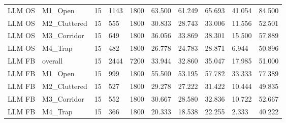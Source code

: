 \begin{tabular}{llllllllll}
LLM OS & M1\_Open & 15 & 1143 & 1800 & 63.500 & 61.249 & 65.693 & 41.054 & 84.500 \\
LLM OS & M2\_Cluttered & 15 & 555 & 1800 & 30.833 & 28.743 & 33.006 & 11.556 & 52.501 \\
LLM OS & M3\_Corridor & 15 & 649 & 1800 & 36.056 & 33.869 & 38.301 & 15.500 & 57.889 \\
LLM OS & M4\_Trap & 15 & 482 & 1800 & 26.778 & 24.783 & 28.871 & 6.944 & 50.896 \\
LLM FB & overall & 15 & 2444 & 7200 & 33.944 & 32.860 & 35.047 & 17.985 & 51.000 \\
LLM FB & M1\_Open & 15 & 999 & 1800 & 55.500 & 53.195 & 57.782 & 33.333 & 77.389 \\
LLM FB & M2\_Cluttered & 15 & 527 & 1800 & 29.278 & 27.222 & 31.422 & 10.444 & 49.835 \\
LLM FB & M3\_Corridor & 15 & 552 & 1800 & 30.667 & 28.580 & 32.836 & 10.722 & 52.667 \\
LLM FB & M4\_Trap & 15 & 366 & 1800 & 20.333 & 18.538 & 22.255 & 2.333 & 40.222 \\
\hline
\end{tabular}
